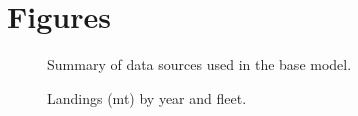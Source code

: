 \documentclass[
]{scrartcl}
\begin{document}
\pagebreak

\newpage{}

\section{Figures}\label{figures}

\begin{figure}


\caption{\label{fig-data}Summary of data sources used in the base
model.}

\end{figure}%

\begin{figure}


\caption{\label{fig-catch}Landings (mt) by year and fleet.}

\end{figure}%
\end{document}
